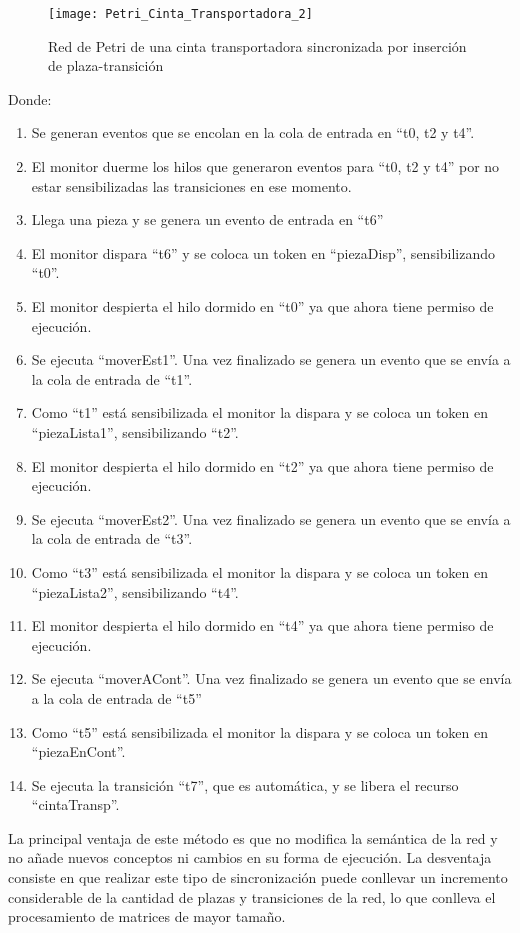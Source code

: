 \begin{figure}[H]
    \centering
    \texttt{[image: Petri\_Cinta\_Transportadora\_2]}
    \caption{Red de Petri de una cinta transportadora sincronizada por inserción
    de plaza-transición}
    \label{fig:petri_cinta_transportadora_2}
\end{figure}


Donde:\\
\begin{enumerate}
	\item Se generan eventos que se encolan en la cola de entrada en “t0, t2 y
		t4”.
	\item El monitor duerme los hilos que generaron eventos para “t0, t2 y t4” por
		no estar sensibilizadas las transiciones en ese momento.
	\item Llega una pieza y se genera un evento de entrada en “t6”
	\item El monitor dispara “t6” y se coloca un token en “piezaDisp”,
		sensibilizando “t0”.
	\item El monitor despierta el hilo dormido en “t0” ya que ahora tiene permiso
		de ejecución.
	\item Se ejecuta “moverEst1”. Una vez finalizado se genera un evento que se
		envía a la cola de entrada de “t1”.
	\item Como “t1” está sensibilizada el monitor la dispara y se coloca un token
		en “piezaLista1”, sensibilizando “t2”.
	\item El monitor despierta el hilo dormido en “t2” ya que ahora tiene permiso
		de ejecución.
	\item Se ejecuta “moverEst2”. Una vez finalizado se genera un evento que se
		envía a la cola de entrada de “t3”.
	\item Como “t3” está sensibilizada el monitor la dispara y se coloca un token
		en “piezaLista2”, sensibilizando “t4”.
	\item El monitor despierta el hilo dormido en “t4” ya que ahora tiene permiso
		de ejecución.
	\item Se ejecuta “moverACont”. Una vez finalizado se genera un evento que se
		envía a la cola de entrada de “t5”
	\item Como “t5” está sensibilizada el monitor la dispara y se coloca un token
		en ``piezaEnCont''.
	\item Se ejecuta la transición ``t7'', que es automática, y se libera el
		recurso ``cintaTransp''.
\end{enumerate}
La principal ventaja de este método es que no modifica la semántica de la red y
no añade nuevos conceptos ni cambios en su forma de ejecución.
La desventaja consiste en que realizar este tipo de sincronización puede
conllevar un incremento considerable de la cantidad de plazas y transiciones de
la red, lo que conlleva el procesamiento de matrices de mayor tamaño.

